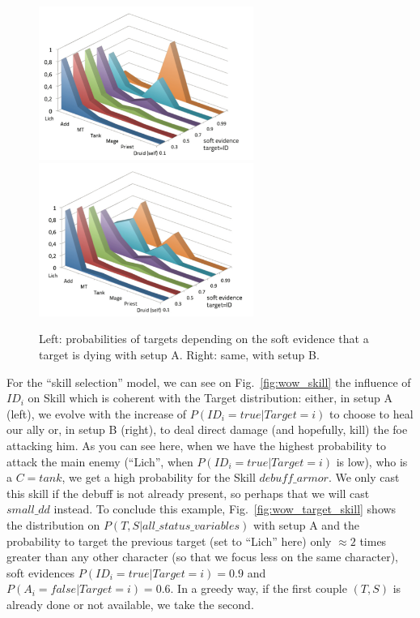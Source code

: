 \begin{figure}[h!]
\begin{center}
\includegraphics[width=7cm]{images/wow_distrib_target1.png} \includegraphics[width=7cm]{images/wow_distrib_target2.png}
\caption{Left: probabilities of targets depending on the soft evidence that a target is dying with setup A. Right: same, with setup B.}
\label{fig:wow_target}
\end{center}
\end{figure}

For the ``skill selection'' model, we can see on Fig.~\ref{fig:wow_skill} the influence of $ID_i$ on Skill which is coherent with the Target distribution: either, in setup A (left), we evolve with the increase of $P(ID_i=true|Target=i)$ to choose to heal our ally or, in setup B (right), to deal direct damage (and hopefully, kill) the foe attacking him. As you can see here, when we have the highest probability to attack the main enemy (``Lich'', when $P(ID_i=true|Target=i)$ is low), who is a $C=tank$, we get a high probability for the Skill $debuff\_armor$. We only cast this skill if the debuff is not already present, so perhaps that we will cast $small\_dd$ instead. To conclude this example, Fig.~\ref{fig:wow_target_skill} shows the distribution on $P(T,S|all\_status\_variables)$ with setup A and the probability to target the previous target (set to ``Lich'' here) only $\approx 2$ times greater than any other character (so that we focus less on the same character), soft evidences $P(ID_i=true|Target=i)=0.9$ and $P(A_i=false|Target=i)=0.6$. In a greedy way, if the first couple $(T,S)$ is already done or not available, we take the second.


